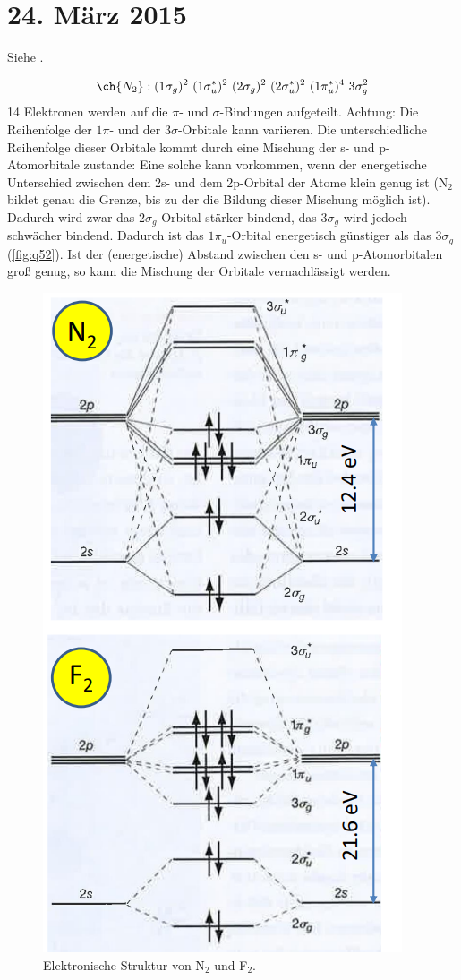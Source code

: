 \section{24. März 2015}

\label{q:51}

Siehe .

\label{q:52}

\[\ch{N_2} : (1\sigma_g)^2 ~ (1\sigma_u^*)^2 ~ (2\sigma_g)^2 ~ (2\sigma_u^*)^2 ~ (1\pi_u^*)^4 ~ 3\sigma_g^2\]
14 Elektronen werden auf die $\pi$- und $\sigma$-Bindungen aufgeteilt. Achtung: Die Reihenfolge der $1\pi$- und der $3\sigma$-Orbitale kann variieren. Die unterschiedliche Reihenfolge dieser Orbitale kommt durch eine Mischung der s- und p-Atomorbitale zustande: Eine solche kann vorkommen, wenn der energetische Unterschied zwischen dem 2s- und dem 2p-Orbital der Atome klein genug ist (N$_2$ bildet genau die Grenze, bis zu der die Bildung dieser Mischung möglich ist). Dadurch wird zwar das $2\sigma_g$-Orbital stärker bindend, das $3\sigma_g$ wird jedoch schwächer bindend. Dadurch ist das $1\pi_u$-Orbital energetisch günstiger als das $3\sigma_g$ (\autoref{fig:q52}). Ist der (energetische) Abstand zwischen den s- und p-Atomorbitalen groß genug, so kann die Mischung der Orbitale vernachlässigt werden.

\begin{figure}[H]
    \centering
    \includegraphics[width=.4\textwidth]{resources/24-03-2015/N2-F2.png}
    \caption{Elektronische Struktur von N$_2$ und F$_2$.}
    \label{fig:q52}
\end{figure}


